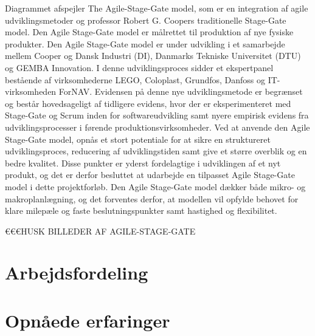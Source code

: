 	Diagrammet afspejler The Agile-Stage-Gate model, som er en integration af agile udviklingsmetoder og professor Robert G. Coopers traditionelle Stage-Gate model. Den Agile Stage-Gate model er målrettet til produktion af nye fysiske produkter. Den Agile Stage-Gate model er under udvikling i et samarbejde mellem Cooper og Dansk Industri (DI), Danmarks Tekniske Universitet (DTU) og GEMBA Innovation. I denne udviklingsproces sidder et ekspertpanel bestående af virksomhederne LEGO, Coloplast, Grundfos, Danfoss og IT-virksomheden ForNAV. Evidensen på denne nye udviklingsmetode er begrænset og består hovedsageligt af tidligere evidens, hvor der er eksperimenteret med Stage-Gate og Scrum inden for softwareudvikling samt nyere empirisk evidens fra udviklingsprocesser i førende produktionsvirksomheder. Ved at anvende den Agile Stage-Gate model, opnås et stort potentiale for at sikre en struktureret udviklingsproces, reducering af udviklingstiden samt give et større overblik og en bedre kvalitet. Disse punkter er yderst fordelagtige i udviklingen af et nyt produkt, og det er derfor besluttet at udarbejde en tilpasset Agile Stage-Gate model i dette projektforløb. Den Agile Stage-Gate model dækker både mikro- og makroplanlægning, og det forventes derfor, at modellen vil opfylde behovet for klare milepæle og faste beslutningspunkter samt hastighed og flexibilitet. 
	   
	
	€€€HUSK BILLEDER AF AGILE-STAGE-GATE 
	 
	 
	
	
\section{Arbejdsfordeling}

\section{Opnåede erfaringer}